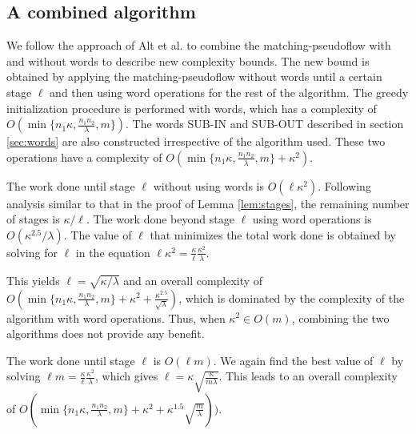 \documentclass{article}
\begin{document}
\subsection{A combined algorithm}
\label{sec:combined}

We follow the approach of Alt et al. \cite{AltBMP91} to combine the
{\sf matching-pseudoflow} with and without words to describe new
complexity bounds.  The new bound is obtained by applying the {\sf
matching-pseudoflow} without words until a certain  stage $\ell$ and
then using word operations for the rest of the algorithm. The greedy
initialization procedure is performed with words, which has a
complexity of \mbox{$O(\min\{n_1\kappa, \frac{n_1n_2}{\lambda},m\})$}.
The words SUB-IN and SUB-OUT described in section \ref{sec:words} are
also constructed irrespective of the algorithm used. These two
operations have a complexity of
\mbox{$O(\min\{n_1\kappa,\frac{n_1n_2}{\lambda},m\} + \kappa^2)$}.
\smallskip

 \smallskip

The work done until stage $\ell$ without using words is $O(\ell \kappa^2)$. Following analysis similar to that in the proof of Lemma \ref{lem:stages}, the remaining number of stages is $\kappa/\ell$.  The work done beyond stage $\ell$ using word operations is $O(\kappa^{2.5}/\lambda)$.  The value of $\ell$ that minimizes the total work done is obtained by solving for $\ell$ in the equation $\ell \kappa^2 = \frac{\kappa}{\ell} \frac{\kappa^{2}}{\lambda}$.

This yields $\ell = \sqrt{\kappa/\lambda}$ and an overall complexity of \mbox{$O(\min\{n_1\kappa,\frac{n_1n_2}{\lambda},m\} + \kappa^2 + \frac{\kappa^{2.5}}{\sqrt{\lambda}})$}, which is dominated by the complexity of the algorithm with word operations. Thus, when $\kappa^2 \in O(m)$, combining the two algorithms does not provide any benefit. \smallskip

 \smallskip

The work done until stage $\ell$ is $O(\ell m)$.  We again find the best value of $\ell$ by solving $\ell m = \frac{\kappa}{\ell} \frac{\kappa^{2}}{\lambda}$, which gives $\ell = \kappa \sqrt{\frac{\kappa}{m \lambda}}$.  This leads to an overall complexity of \mbox{$O(\min\{n_1\kappa,\frac{n_1n_2}{\lambda},m\} + \kappa^2 + \kappa^{1.5}\sqrt{\frac{m}{\lambda}}))$}.
\end{document}
